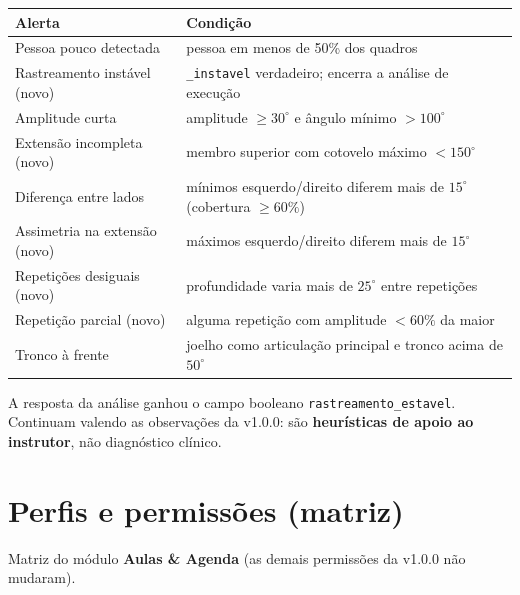 \documentclass[11pt,a4paper]{article}
\newcommand{\cod}[1]{\texttt{#1}}
\begin{document}
\begin{xltabular}{\textwidth}{l Y}
  \toprule
  \textbf{Alerta} & \textbf{Condição} \\
  \midrule
  \endhead
  Pessoa pouco detectada            & pessoa em menos de 50\% dos quadros \\
  Rastreamento instável (novo)      & \cod{\_instavel} verdadeiro; encerra a análise de execução \\
  Amplitude curta                   & amplitude $\geq 30^\circ$ e ângulo mínimo $> 100^\circ$ \\
  Extensão incompleta (novo)        & membro superior com cotovelo máximo $< 150^\circ$ \\
  Diferença entre lados             & mínimos esquerdo/direito diferem mais de $15^\circ$ (cobertura $\geq 60\%$) \\
  Assimetria na extensão (novo)     & máximos esquerdo/direito diferem mais de $15^\circ$ \\
  Repetições desiguais (novo)       & profundidade varia mais de $25^\circ$ entre repetições \\
  Repetição parcial (novo)          & alguma repetição com amplitude $< 60\%$ da maior \\
  Tronco à frente                   & joelho como articulação principal e tronco acima de $50^\circ$ \\
  \bottomrule
\end{xltabular}

A resposta da análise ganhou o campo booleano \cod{rastreamento\_estavel}. Continuam valendo as
observações da v1.0.0: são \textbf{heurísticas de apoio ao instrutor}, não diagnóstico clínico.

\section{Perfis e permissões (matriz)}

Matriz do módulo \textbf{Aulas \& Agenda} (as demais permissões da v1.0.0 não mudaram).
\end{document}

